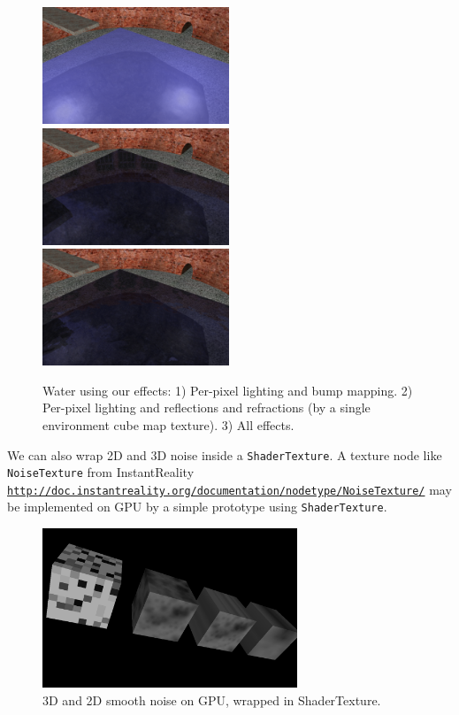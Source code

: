 \documentclass{acmsiggraph}                     %
\newcommand*{\myhref}[2]{\texttt{\href{#1}{\nolinkurl{#2}}}}
\begin{document}
\begin{figure}[t]
  \centering
  \includegraphics[width=2.2in]{water_shaders_1}
  \includegraphics[width=2.2in]{water_shaders_2}
  \includegraphics[width=2.2in]{water_shaders_3}
  \caption{Water using our effects: 1) Per-pixel lighting and bump mapping.
2) Per-pixel lighting and reflections and refractions (by a single environment cube map texture).
3) All effects.}
\end{figure}

We can also wrap 2D and 3D noise inside a \texttt{ShaderTexture}.
A texture node like \texttt{NoiseTexture} from InstantReality
\myhref{http://doc.instantreality.org/documentation/nodetype/NoiseTexture/}{http://doc.instantreality.org/documentation/nodetype/NoiseTexture/}
may be implemented on GPU by a simple prototype using \texttt{ShaderTexture}.

\begin{figure}[H]
  \centering
  \includegraphics[width=3in]{noise}
  \caption{3D and 2D smooth noise on GPU, wrapped in ShaderTexture.}
\end{figure}
\end{document}
